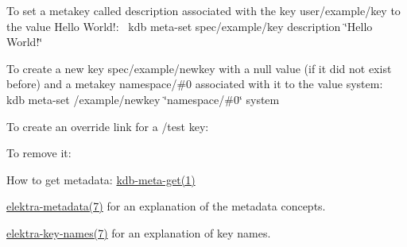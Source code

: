 To set a metakey called {\ttfamily description} associated with the key {\ttfamily user/example/key} to the value {\ttfamily Hello World!}\+:~\newline
 {\ttfamily kdb meta-\/set spec/example/key description \char`\"{}\+Hello World!\char`\"{}}

To create a new key {\ttfamily spec/example/newkey} with a null value (if it did not exist before) and a metakey {\ttfamily namespace/\#0} associated with it to the value {\ttfamily system}\+:~\newline
 {\ttfamily kdb meta-\/set /example/newkey \char`\"{}namespace/\#0\char`\"{} system}

To create an override link for a {\ttfamily /test} key\+:


\begin{DoxyCode}{0}
\end{DoxyCode}


To remove it\+:


\begin{DoxyCode}{0}
\end{DoxyCode}



\begin{DoxyItemize}
\item How to get metadata\+: \mbox{\hyperlink{doc_help_kdb-meta-get_md}{kdb-\/meta-\/get(1)}}
\item \mbox{\hyperlink{doc_help_elektra-metadata_md}{elektra-\/metadata(7)}} for an explanation of the metadata concepts.
\item \mbox{\hyperlink{doc_help_elektra-key-names_md}{elektra-\/key-\/names(7)}} for an explanation of key names. 
\end{DoxyItemize}